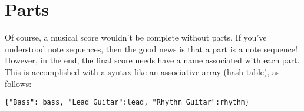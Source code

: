 \documentclass{scrartcl}
\begin{document}
\section{Parts}
Of course, a musical score wouldn't be complete without parts. If you've understood note sequences, then the good news is that a part is a note sequence! However, in the end, the final score needs have a name associated with each part. This is accomplished with a syntax like an associative array (hash table), as follows:
\begin{center}
\verb|{"Bass": bass, "Lead Guitar":lead, "Rhythm Guitar":rhythm}|
\end{center}
\end{document}

